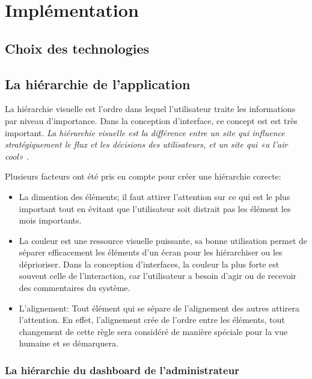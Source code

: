 \chapter{Implémentation}
        \section{Choix des technologies}
                
        \section{La hiérarchie de l'application}
                
        La hiérarchie visuelle est l'ordre dans lequel l'utilisateur traite les informations par niveau d'importance.
        Dans la conception d'interface, ce concept est est très important.
        \textit{La hiérarchie visuelle est la différence entre un site qui influence stratégiquement le flux et les 
        décisions des utilisateurs, et un site qui «a l'air cool» \cite{cao20155}.}
        \par 
        Plusieurs facteurs ont été pris en compte pour créer une hiérarchie corecte:
        \begin{itemize}
                \item La dimention des éléments; il faut attirer l'attention sur ce qui est le plus important
                tout en évitant que l'utilisateur soit distrait pas les élément les mois importants.
                \item La couleur est une ressource visuelle puissante, sa bonne utilisation permet de séparer 
                efficacement les éléments d'un écran pour les hiérarchiser ou les déprioriser. Dans la 
                conception d’interfaces, la couleur la plus forte est souvent celle de l’interaction, 
                car l’utilisateur a besoin d’agir ou de recevoir des commentaires du système.
                \item L'alignement: Tout élément qui se sépare de l'alignement des autres attirera l'attention. 
                En effet, l'alignement crée de l'ordre entre les éléments, tout changement de cette règle sera 
                considéré de manière spéciale pour la vue humaine et se démarquera.
        \end{itemize}
        \subsection{La hiérarchie du dashboard de l'administrateur}
        
